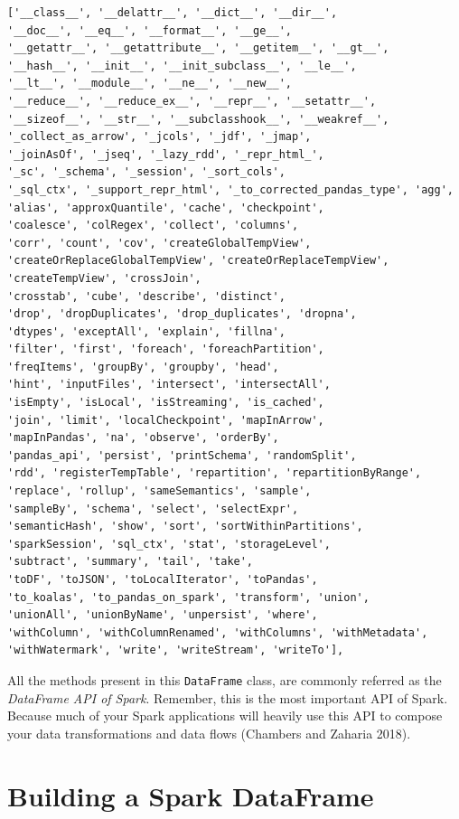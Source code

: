 \documentclass[
  11pt,
  letterpaper,
  DIV=11,
  numbers=noendperiod]{scrreprt}
\begin{document}
\begin{verbatim}
['__class__', '__delattr__', '__dict__', '__dir__',
'__doc__', '__eq__', '__format__', '__ge__',
'__getattr__', '__getattribute__', '__getitem__', '__gt__',
'__hash__', '__init__', '__init_subclass__', '__le__',
'__lt__', '__module__', '__ne__', '__new__',
'__reduce__', '__reduce_ex__', '__repr__', '__setattr__',
'__sizeof__', '__str__', '__subclasshook__', '__weakref__',
'_collect_as_arrow', '_jcols', '_jdf', '_jmap',
'_joinAsOf', '_jseq', '_lazy_rdd', '_repr_html_',
'_sc', '_schema', '_session', '_sort_cols',
'_sql_ctx', '_support_repr_html', '_to_corrected_pandas_type', 'agg',
'alias', 'approxQuantile', 'cache', 'checkpoint',
'coalesce', 'colRegex', 'collect', 'columns',
'corr', 'count', 'cov', 'createGlobalTempView',
'createOrReplaceGlobalTempView', 'createOrReplaceTempView', 'createTempView', 'crossJoin',
'crosstab', 'cube', 'describe', 'distinct',
'drop', 'dropDuplicates', 'drop_duplicates', 'dropna',
'dtypes', 'exceptAll', 'explain', 'fillna',
'filter', 'first', 'foreach', 'foreachPartition',
'freqItems', 'groupBy', 'groupby', 'head',
'hint', 'inputFiles', 'intersect', 'intersectAll',
'isEmpty', 'isLocal', 'isStreaming', 'is_cached',
'join', 'limit', 'localCheckpoint', 'mapInArrow',
'mapInPandas', 'na', 'observe', 'orderBy',
'pandas_api', 'persist', 'printSchema', 'randomSplit',
'rdd', 'registerTempTable', 'repartition', 'repartitionByRange',
'replace', 'rollup', 'sameSemantics', 'sample',
'sampleBy', 'schema', 'select', 'selectExpr',
'semanticHash', 'show', 'sort', 'sortWithinPartitions',
'sparkSession', 'sql_ctx', 'stat', 'storageLevel',
'subtract', 'summary', 'tail', 'take',
'toDF', 'toJSON', 'toLocalIterator', 'toPandas',
'to_koalas', 'to_pandas_on_spark', 'transform', 'union',
'unionAll', 'unionByName', 'unpersist', 'where',
'withColumn', 'withColumnRenamed', 'withColumns', 'withMetadata',
'withWatermark', 'write', 'writeStream', 'writeTo'],
\end{verbatim}

All the methods present in this \texttt{DataFrame} class, are commonly
referred as the \emph{DataFrame API of Spark}. Remember, this is the
most important API of Spark. Because much of your Spark applications
will heavily use this API to compose your data transformations and data
flows (Chambers and Zaharia 2018).

\hypertarget{sec-building-a-dataframe}{%
\section{Building a Spark DataFrame}\label{sec-building-a-dataframe}}
\end{document}

